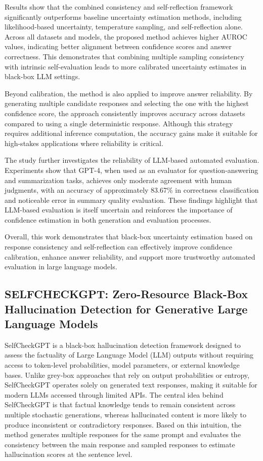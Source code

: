 Results show that the combined consistency and self-reflection framework significantly outperforms baseline uncertainty estimation methods, including likelihood-based uncertainty, temperature sampling, and self-reflection alone. Across all datasets and models, the proposed method achieves higher AUROC values, indicating better alignment between confidence scores and answer correctness. This demonstrates that combining multiple sampling consistency with intrinsic self-evaluation leads to more calibrated uncertainty estimates in black-box LLM settings.

Beyond calibration, the method is also applied to improve answer reliability. By generating multiple candidate responses and selecting the one with the highest confidence score, the approach consistently improves accuracy across datasets compared to using a single deterministic response. Although this strategy requires additional inference computation, the accuracy gains make it suitable for high-stakes applications where reliability is critical.

The study further investigates the reliability of LLM-based automated evaluation. Experiments show that GPT-4, when used as an evaluator for question-answering and summarization tasks, achieves only moderate agreement with human judgments, with an accuracy of approximately 83.67\% in correctness classification and noticeable error in summary quality evaluation. These findings highlight that LLM-based evaluation is itself uncertain and reinforces the importance of confidence estimation in both generation and evaluation processes.

Overall, this work demonstrates that black-box uncertainty estimation based on response consistency and self-reflection can effectively improve confidence calibration, enhance answer reliability, and support more trustworthy automated evaluation in large language models.


\subsection{SELFCHECKGPT: Zero-Resource Black-Box Hallucination Detection
for Generative Large Language Models}

SelfCheckGPT is a black-box hallucination detection framework designed to assess the factuality of Large Language Model (LLM) outputs without requiring access to token-level probabilities, model parameters, or external knowledge bases. Unlike grey-box approaches that rely on output probabilities or entropy, SelfCheckGPT operates solely on generated text responses, making it suitable for modern LLMs accessed through limited APIs. The central idea behind SelfCheckGPT is that factual knowledge tends to remain consistent across multiple stochastic generations, whereas hallucinated content is more likely to produce inconsistent or contradictory responses. Based on this intuition, the method generates multiple responses for the same prompt and evaluates the consistency between the main response and sampled responses to estimate hallucination scores at the sentence level.

